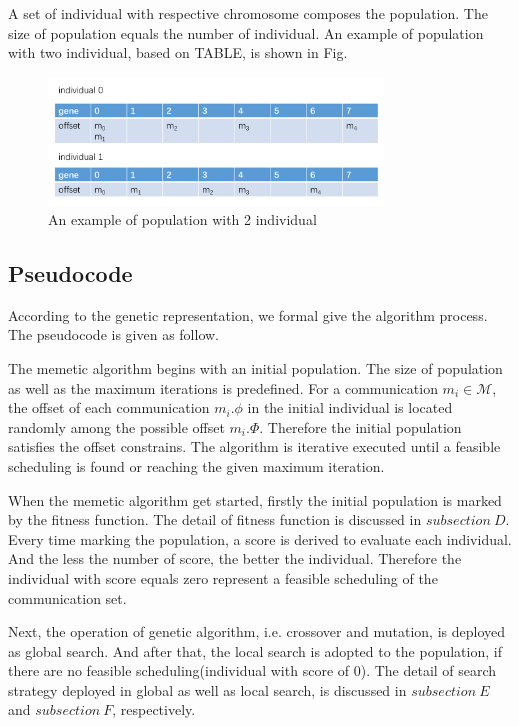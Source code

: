 \documentclass[conference]{IEEEtran}
\begin{document}
A set of individual with respective chromosome composes the population. The size of population equals the number of individual. An example of population with two individual, based on TABLE, is shown in Fig.

\begin{figure}[!t]
	\centering
	\includegraphics[width=3.5in]{picture/2individual}
	\caption{An example of population with 2 individual}
	\label{f:indi}
\end{figure}

\subsection{Pseudocode}

According to the genetic representation, we formal give the algorithm process. The pseudocode is given as follow.

The memetic algorithm begins with an initial population. The size of population as well as the maximum iterations is predefined. For a communication $m_{i}\in\mathcal{M}$, the offset of each communication $m_{i}.\phi$ in the initial individual is located randomly among the possible offset $m_{i}.\Phi$. Therefore the initial population satisfies the offset constrains. The algorithm is iterative executed until a feasible scheduling is found or reaching the given maximum iteration.

When the memetic algorithm get started, firstly the initial population is marked by the fitness function. The detail of fitness function is discussed in $subsection\ D$. Every time marking the population, a score is derived to evaluate each individual. And the less the number of score, the better the individual. Therefore the individual with score equals zero represent a feasible scheduling of the communication set.

Next, the operation of genetic algorithm, i.e. crossover and mutation, is deployed as global search. And after that, the local search is adopted to the population, if there are no feasible scheduling(individual with score of 0). The detail of search strategy deployed in global as well as local search, is discussed in $subsection\ E$ and $subsection\ F$, respectively.
\end{document}
